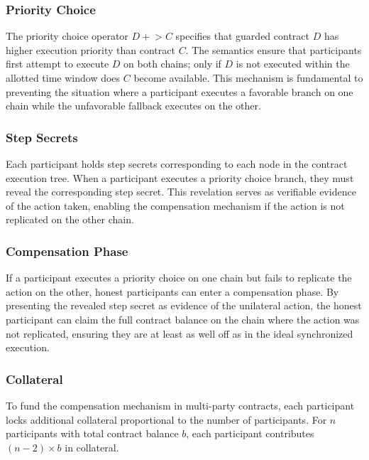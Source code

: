\documentclass[journal]{IEEEtran}
\begin{document}
\subsubsection{Priority Choice}

The priority choice operator $D +\!\!> C$ specifies that guarded contract $D$ has higher execution priority than contract $C$. The semantics ensure that participants first attempt to execute $D$ on both chains; only if $D$ is not executed within the allotted time window does $C$ become available. This mechanism is fundamental to preventing the situation where a participant executes a favorable branch on one chain while the unfavorable fallback executes on the other.

\subsubsection{Step Secrets}

Each participant holds step secrets corresponding to each node in the contract execution tree. When a participant executes a priority choice branch, they must reveal the corresponding step secret. This revelation serves as verifiable evidence of the action taken, enabling the compensation mechanism if the action is not replicated on the other chain.

\subsubsection{Compensation Phase}

If a participant executes a priority choice on one chain but fails to replicate the action on the other, honest participants can enter a compensation phase. By presenting the revealed step secret as evidence of the unilateral action, the honest participant can claim the full contract balance on the chain where the action was not replicated, ensuring they are at least as well off as in the ideal synchronized execution.

\subsubsection{Collateral}

To fund the compensation mechanism in multi-party contracts, each participant locks additional collateral proportional to the number of participants. For $n$ participants with total contract balance $b$, each participant contributes $(n-2) \times b$ in collateral.
\end{document}
